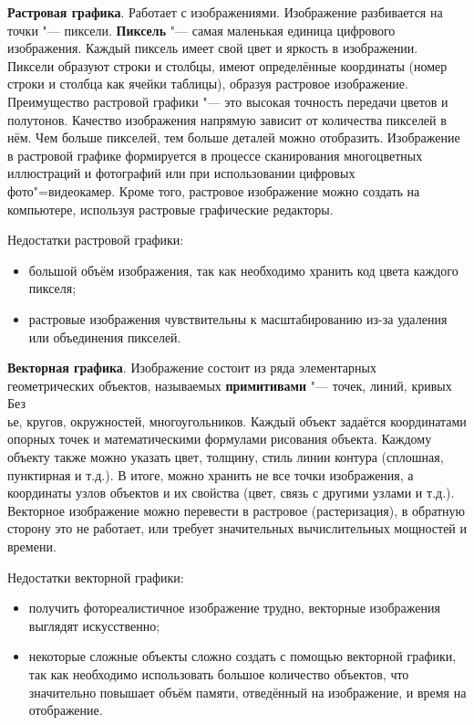 \textbf{Растровая графика}. Работает с изображениями. Изображение разбивается на точки "--- пиксели. \textbf{Пиксель} "--- самая маленькая единица цифрового изображения. Каждый пиксель имеет свой цвет и яркость в изображении. Пиксели образуют строки и столбцы, имеют определённые координаты (номер строки и столбца как ячейки таблицы), образуя растровое изображение. Преимущество растровой графики "--- это высокая точность передачи цветов и полутонов. Качество изображения напрямую зависит от количества пикселей в нём. Чем больше пикселей, тем больше деталей можно отобразить. Изображение в растровой графике формируется в процессе сканирования многоцветных иллюстраций и фотографий или при использовании цифровых фото"=видеокамер. Кроме того, растровое изображение можно создать на компьютере, используя растровые графические редакторы\cite{burceva2023cg}.

Недостатки растровой графики:
\begin{itemize}
    \item большой объём изображения, так как необходимо хранить код цвета каждого пикселя;
    \item растровые изображения чувствительны к масштабированию из-за удаления или объединения пикселей.
\end{itemize}

\textbf{Векторная графика}. Изображение состоит из ряда элементарных геометрических объектов, называемых \textbf{примитивами} "--- точек, линий, кривых Без\\ье, кругов, окружностей, многоугольников. Каждый объект задаётся координатами опорных точек и математическими формулами рисования объекта. Каждому объекту также можно указать цвет, толщину, стиль линии контура (сплошная, пунктирная и т.д.). В итоге, можно хранить не все точки изображения, а координаты узлов объектов и их свойства (цвет, связь с другими узлами и т.д.). Векторное изображение можно перевести в растровое (растеризация), в обратную сторону это не работает, или требует значительных вычислительных мощностей и времени\cite{burceva2023cg}.

Недостатки векторной графики:
\begin{itemize}
    \item получить фотореалистичное изображение трудно, векторные изображения выглядят искусственно;
    \item некоторые сложные объекты сложно создать с помощью векторной графики, так как необходимо использовать большое количество объектов, что значительно повышает объём памяти, отведённый на изображение, и время на отображение.
\end{itemize}

